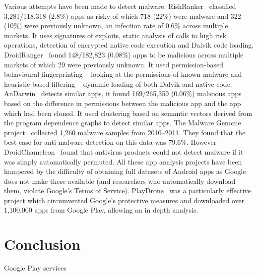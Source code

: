 \documentclass[conference,a4paper,twoside]{IEEEtran}
\begin{document}
Various attempts have been made to detect malware.
RiskRanker~\cite{Grace2012a} classified 3,281/118,318 (2.8\%) apps as risky of which 718 (22\%) were malware and 322 (10\%) were previously unknown, an infection rate of 0.6\% across multiple markets. It uses signatures of exploits, static analysis of calls to high risk operations, detection of encrypted native code execution and Dalvik code loading.
DroidRanger~\cite{Zhou2012a} found 148/182,823 (0.08\%) apps to be malicious across multiple markets of which 29 were previously unknown.
It used permission-based behavioural fingerprinting -- looking at the permissions of known malware and heuristic-based filtering -- dynamic loading of both Dalvik and native code.
AnDarwin~\cite{Crussell2013} detects similar apps, it found 169/265,359 (0.06\%) malicious apps based on the difference in permissions between the malicious app and the app which had been cloned.
It used clustering based on semantic vectors derived from the program dependence graphs to detect similar apps.
The Malware Genome project~\cite{Zhou2012b} collected 1,260 malware samples from 2010--2011.
They found that the best case for anti-malware detection on this data was 79.6\%.
However DroidChameleon~\cite{Rastogi2013} found that antivirus products could not detect malware if it was simply automatically permuted.
All these app analysis projects have been hampered by the difficulty of obtaining full datasets of Android apps as Google does not make these available (and researchers who automatically download them, violate Google's Terms of Service).
PlayDrone~\cite{Viennot2014} was a particularly effective project which circumvented Google's protective measures and downloaded over 1,100,000 apps from Google Play, allowing an in depth analysis.





\section{Conclusion}
\label{sec:conclusion}
Google Play services

\printbibliography
\end{document}

